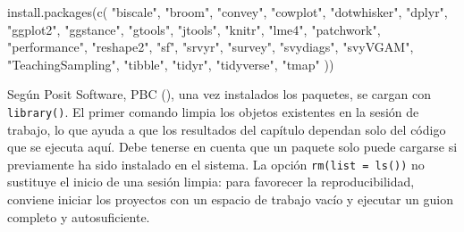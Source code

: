 \documentclass[
  spanish,
  11pt,
  letterpaper,
  oneside,
  open=any]{scrbook}
\newenvironment{Shaded}{\begin{snugshade}}{\end{snugshade}}
\newcommand{\FunctionTok}[1]{\textcolor[rgb]{0.28,0.35,0.67}{#1}}
\newcommand{\NormalTok}[1]{\textcolor[rgb]{0.00,0.23,0.31}{#1}}
\newcommand{\StringTok}[1]{\textcolor[rgb]{0.13,0.47,0.30}{#1}}
\begin{document}
\begin{Shaded}
\begin{Highlighting}[]
\FunctionTok{install.packages}\NormalTok{(}\FunctionTok{c}\NormalTok{(}
  \StringTok{"biscale"}\NormalTok{, }\StringTok{"broom"}\NormalTok{, }\StringTok{"convey"}\NormalTok{, }\StringTok{"cowplot"}\NormalTok{,}
  \StringTok{"dotwhisker"}\NormalTok{, }\StringTok{"dplyr"}\NormalTok{, }\StringTok{"ggplot2"}\NormalTok{, }\StringTok{"ggstance"}\NormalTok{,}
  \StringTok{"gtools"}\NormalTok{, }\StringTok{"jtools"}\NormalTok{, }\StringTok{"knitr"}\NormalTok{, }\StringTok{"lme4"}\NormalTok{,}
  \StringTok{"patchwork"}\NormalTok{, }\StringTok{"performance"}\NormalTok{, }\StringTok{"reshape2"}\NormalTok{, }\StringTok{"sf"}\NormalTok{,}
  \StringTok{"srvyr"}\NormalTok{, }\StringTok{"survey"}\NormalTok{, }\StringTok{"svydiags"}\NormalTok{, }\StringTok{"svyVGAM"}\NormalTok{,}
  \StringTok{"TeachingSampling"}\NormalTok{, }\StringTok{"tibble"}\NormalTok{, }\StringTok{"tidyr"}\NormalTok{, }\StringTok{"tidyverse"}\NormalTok{,}
  \StringTok{"tmap"}
\NormalTok{))}
\end{Highlighting}
\end{Shaded}

Según Posit Software, PBC (), una
vez instalados los paquetes, se cargan con \texttt{library()}. El primer
comando limpia los objetos existentes en la sesión de trabajo, lo que
ayuda a que los resultados del capítulo dependan solo del código que se
ejecuta aquí. Debe tenerse en cuenta que un paquete solo puede cargarse
si previamente ha sido instalado en el sistema. La opción
\texttt{rm(list\ =\ ls())} no sustituye el inicio de una sesión limpia:
para favorecer la reproducibilidad, conviene iniciar los proyectos con
un espacio de trabajo vacío y ejecutar un guion completo y
autosuficiente.
\end{document}
